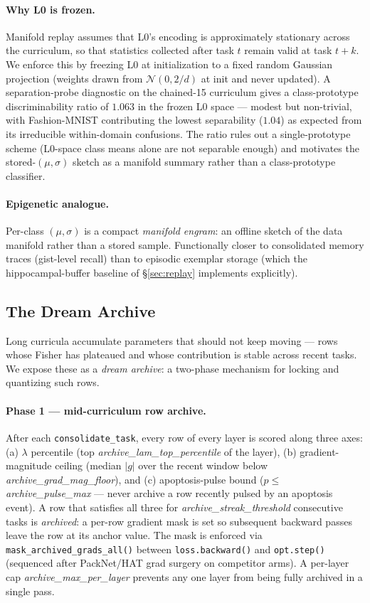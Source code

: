\documentclass[11pt]{article}
\begin{document}
\paragraph{Why L0 is frozen.}
Manifold replay assumes that L0's encoding is approximately stationary
across the curriculum, so that statistics collected after task $t$
remain valid at task $t + k$. We enforce this by freezing L0 at
initialization to a fixed random Gaussian projection (weights drawn
from $\mathcal{N}(0, 2/d)$ at init and never updated). A
separation-probe diagnostic on the chained-15 curriculum gives a
class-prototype discriminability ratio of $1.063$ in the frozen L0
space --- modest but non-trivial, with Fashion-MNIST contributing the
lowest separability ($1.04$) as expected from its irreducible
within-domain confusions. The ratio rules out a single-prototype
scheme (L0-space class means alone are not separable enough) and
motivates the stored-$(\mu, \sigma)$ sketch as a manifold summary
rather than a class-prototype classifier.

\paragraph{Epigenetic analogue.}
Per-class $(\mu, \sigma)$ is a compact \emph{manifold engram}: an
offline sketch of the data manifold rather than a stored sample.
Functionally closer to consolidated memory traces (gist-level recall)
than to episodic exemplar storage (which the hippocampal-buffer
baseline of \S\ref{sec:replay} implements explicitly).

\subsection{The Dream Archive}
\label{sec:archive}\label{app:archive}

Long curricula accumulate parameters that should not keep moving ---
rows whose Fisher has plateaued and whose contribution is stable across
recent tasks. We expose these as a \emph{dream archive}: a two-phase
mechanism for locking and quantizing such rows.

\paragraph{Phase 1 --- mid-curriculum row archive.}
After each \texttt{consolidate\_task}, every row of every layer is
scored along three axes: (a) $\lambda$ percentile (top
\textit{archive\_lam\_top\_percentile} of the layer), (b)
gradient-magnitude ceiling (median $|g|$ over the recent window below
\textit{archive\_grad\_mag\_floor}), and (c) apoptosis-pulse bound
($p \leq$ \textit{archive\_pulse\_max} --- never archive a row recently
pulsed by an apoptosis event). A row that satisfies all three for
\textit{archive\_streak\_threshold} consecutive tasks is
\emph{archived}: a per-row gradient mask is set so subsequent backward
passes leave the row at its anchor value. The mask is enforced via
\texttt{mask\_archived\_grads\_all()} between \texttt{loss.backward()}
and \texttt{opt.step()} (sequenced after PackNet/HAT grad surgery on
competitor arms). A per-layer cap \textit{archive\_max\_per\_layer}
prevents any one layer from being fully archived in a single pass.
\end{document}
